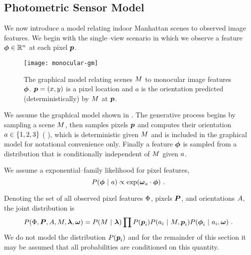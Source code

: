 \subsection{Photometric Sensor Model}

We now introduce a model relating indoor Manhattan scenes to observed
image features. We begin with the single--view scenario in which we
observe a feature $\Feature\in\Reals^n$ at each pixel $\Pixel$.

\begin{figure}[tb]
  \centering
  \texttt{[image: monocular-gm]}
  \caption{The graphical model relating scenes $\Scene$ to monocular
    image features $\Feature$. $\Pixel=(x,y)$ is a pixel location and
    $a$ is the orientation predicted (deterministically) by $\Scene$
    at $\Pixel$.}
  \label{fig:photometric-gm}
\end{figure}

We assume the graphical model shown in . The
generative process begins by sampling a scene $\Scene$, then samples
pixels $\Pixel$ and computes their orientation
$\Orient\in\Orientations$ (\cf
{}), which is deterministic given $\Scene$
and is included in the graphical model for notational convenience
only. Finally a feature $\Feature$ is sampled from a distribution that
is conditionally independent of $\Scene$ given $\Orient$.

We assume a exponential--family likelihood for pixel features,
\begin{equation}
  \label{eq:pixel-likelihood}
  P(\Feature ~|~ \Orient) \propto
    \exp(\PixelModel_\Orient \cdot \Feature) ~.
\end{equation}

Denoting the set of all observed pixel
features $\Features$, pixels $\Pixels$, and orientations $\Orients$,
the joint distribution is
\begin{equation}
  P(\Features, \Pixels, \Orients, \Scene, \Penalties, \PixelModel) =
    P(\Scene ~|~ \Penalties) 
    \prod P(\Pixel_i)
          P(\Orient_i ~|~ \Scene, \Pixel_i)
          P(\Feature_i ~|~ \Orient_i, \PixelModel) ~.
\end{equation}
We do not model the distribution $P(\Pixel_i)$ and for the remainder
of this section it may be assumed that all probabilities are
conditioned on this quantity.

